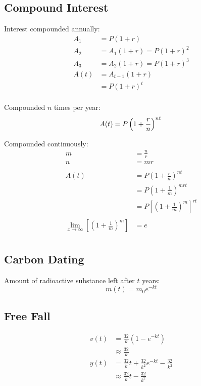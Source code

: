 \documentclass{exam}
\begin{document}
  \subsection{Compound Interest}

  Interest compounded annually:
  \begin{align*}
    A_1  &= P(1 + r) \\
    A_2  &= A_1(1 + r) = P(1 + r)^2 \\
    A_3  &= A_2(1 + r) = P(1 + r)^3 \\
    A(t) &= A_{t - 1}(1 + r) \\
         &= P(1 + r)^t \\
  \end{align*}

  Compounded $n$ times per year: 
  \[
    A(t) = P \left( 1 + \frac{r}{n} \right)^{nt} \\
  \]

  Compounded continuously:
  \begin{align*}
    m &= \frac{n}{r} \\
    n &= mr \\
    \\
    A(t) &= P\left(1 + \frac{r}{n}\right)^{nt} \\
         &= P\left(1 + \frac{1}{m}\right)^{mrt} \\
         &= P \left[ \left(1 + \frac{1}{m}\right)^{m} \right]^{rt} \\
    \\
    \lim_{x \to \infty} \left[ \left(1 + \frac{1}{m}\right)^{m} \right] &= e \\
  \end{align*}

  \subsection{Carbon Dating}

  Amount of radioactive substance left after $t$ years:
  \[
    m(t) = m_0 e^{-kt}
  \]

  \pagebreak

  \subsection{Free Fall}

  \begin{align*}
    v(t) &= \frac{32}{k} \left( 1 - e^{-kt} \right) \\
         &\approx \frac{32}{k} \\
    y(t) &= \frac{32}{k} t + \frac{32}{k^2} e^{-kt} - \frac{32}{k^2} \\
         &\approx \frac{32}{k} t - \frac{32}{k^2} \\
  \end{align*}
\end{document}

